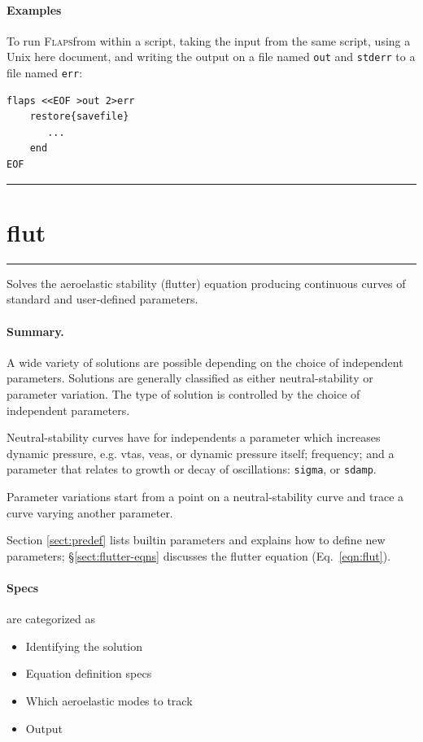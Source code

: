 \documentclass[11pt,openany,twoside]{book}
\makeatletter
\numberwithin{equation}{section}		%
\newcommand{\Cmd}[1]{{\sf #1}}
\newcommand{\Code}[1]{{\small\tt #1}}
\newcommand{\Flaps}{\textsc{Flaps\:}}
\newcommand{\Manpg}[1]{
	\hspace{-\parindent}\rule[-5mm]{\textwidth}{0.3mm}
	\newpage
	\section[\Cmd{#1}]{\sf\Large{#1}} \label{ref:#1} \index{#1@\Cmd{#1}!reference}
	\rule[5mm]{\textwidth}{0.3mm}
}
\newcommand{\Sectref}[1]{\S\ref{#1}}
\newcommand{\Eqn}[1]{Eq.\ \ref{#1}}  %
\makeatother
\begin{document}
\paragraph{Examples}
To run \Flaps from within a script, taking the input from the
same script, using a Unix \Cmd{here} document, and writing
the output on a file named \Code{out} and \Code{stderr} to a
file named \Code{err}:
\begin{lstlisting}
flaps <<EOF >out 2>err
    restore{savefile}
       ...
    end
EOF
\end{lstlisting}

\Manpg{flut}
Solves the aeroelastic stability (flutter) equation
producing continuous curves of standard and user-defined
parameters.

\paragraph{Summary.}
A wide variety of solutions are possible depending on the
choice of independent parameters.
Solutions are generally classified as either neutral-stability
or parameter variation.
The type of solution is controlled by the choice
of independent parameters.
\par
Neutral-stability curves have for independents a parameter
which increases dynamic pressure, e.g. vtas, veas, or
dynamic pressure itself; frequency; and a parameter
that relates to growth or decay of oscillations:
\Code{sigma}, or \Code{sdamp}.
\par
Parameter variations start from a point on a neutral-stability
curve and trace a curve varying another parameter.
\par
Section \ref{sect:predef} lists builtin parameters
and explains how to define new parameters; \Sectref{sect:flutter-eqns}
discusses the flutter equation (\Eqn{eqn:flut}).

\paragraph{Specs} are categorized as
\begin{itemize}
\item Identifying the solution
\item Equation definition specs
\item Which aeroelastic modes to track
\item Output
\end{itemize}
\end{document}
